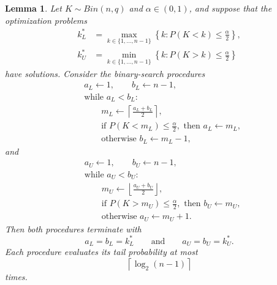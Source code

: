 \documentclass{article}
\newtheorem{lemma}{Lemma}
\begin{document}
\begin{lemma}
Let $K\sim Bin(n,q)$ and $\alpha\in(0,1)$, and suppose that the optimization problems
$$
\begin{aligned}
k_L^*
&=
\max_{k\in\{1,\ldots,n-1\}}
\left\{
k:
P(K<k)\leq\frac{\alpha}{2}
\right\},\\
k_U^*
&=
\min_{k\in\{1,\ldots,n-1\}}
\left\{
k:
P(K>k)\leq\frac{\alpha}{2}
\right\}
\end{aligned}
$$
have solutions. Consider the binary-search procedures
$$
\begin{aligned}
&a_L\leftarrow 1,\qquad b_L\leftarrow n-1,\\
&\text{while } a_L<b_L:\\
&\qquad m_L\leftarrow
\left\lceil\frac{a_L+b_L}{2}\right\rceil,\\
&\qquad\text{if }
P(K<m_L)\leq\frac{\alpha}{2},
\text{ then }
a_L\leftarrow m_L,\\
&\qquad\text{otherwise }
b_L\leftarrow m_L-1,
\end{aligned}
$$
and
$$
\begin{aligned}
&a_U\leftarrow 1,\qquad b_U\leftarrow n-1,\\
&\text{while } a_U<b_U:\\
&\qquad m_U\leftarrow
\left\lfloor\frac{a_U+b_U}{2}\right\rfloor,\\
&\qquad\text{if }
P(K>m_U)\leq\frac{\alpha}{2},
\text{ then }
b_U\leftarrow m_U,\\
&\qquad\text{otherwise }
a_U\leftarrow m_U+1.
\end{aligned}
$$
Then both procedures terminate with
$$
a_L=b_L=k_L^*
\qquad\text{and}\qquad
a_U=b_U=k_U^*.
$$
Each procedure evaluates its tail probability at most
$$
\left\lceil\log_2(n-1)\right\rceil
$$
times.
\end{lemma}
\end{document}
